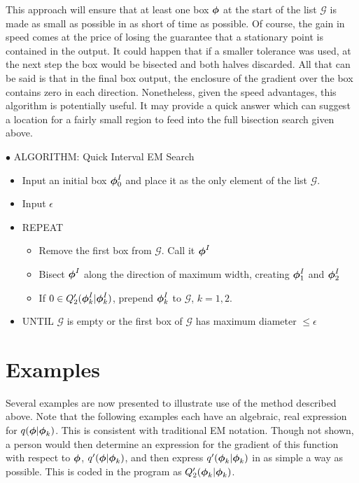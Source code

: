   This approach will ensure that at least one box $\mbox{\boldmath $\phi$}$ at the
start of the list $\mathcal{G}$ is made as small as possible in as
short of time as possible.  Of course, the gain in speed comes at
the price of losing the guarantee that a stationary point is
contained in the output.  It could happen that if a smaller
tolerance was used, at the next step the box would be bisected and
both halves discarded.  All that can be said is that in the final
box output, the enclosure of the gradient over the box contains zero
in each direction.  Nonetheless, given the speed advantages,
this algorithm is potentially useful.  It may provide a quick answer
which can suggest a location for a fairly small region to feed into
the full bisection search given above.


$\bullet$ ALGORITHM: Quick Interval EM Search
\begin{itemize}
\item[] Input an initial box $\mbox{\boldmath $\phi$}^I_0$ and place it as the only element of the list $\mathcal{G}$.
\item[] Input $\epsilon$
\item[] REPEAT
  \begin{itemize}
  \item[] Remove the first box from $\mathcal{G}$.  Call it $\mbox{\boldmath $\phi$}^I$
  \item[] Bisect $\mbox{\boldmath $\phi$}^I$ along the direction of maximum width,
  creating $\mbox{\boldmath $\phi$}^I_1$ and $\mbox{\boldmath $\phi$}^I_2$
  \item[] If $0 \in Q'_2(\mbox{\boldmath $\phi$}^I_k|\mbox{\boldmath $\phi$}^I_k)$, prepend $\mbox{\boldmath $\phi$}^I_k$ to
  $\mathcal{G}$, $k=1,2$.
  \end{itemize}
\item[] UNTIL $\mathcal{G}$ is empty or the first box of
  $\mathcal{G}$ has maximum diameter $ \leq \epsilon$
\end{itemize}


\section{Examples}\label{section:examples}

Several examples are now presented to illustrate use of
the method described above.
Note that the following examples each have an algebraic, real expression for
$q(\mbox{\boldmath $\phi$} | \mbox{\boldmath $\phi$}_k)$.  This is consistent with traditional EM notation. 
Though not shown, a person would then determine an expression for the gradient
of this function with respect to $\mbox{\boldmath $\phi$}$, $q'(\mbox{\boldmath $\phi$} | \mbox{\boldmath $\phi$}_k)$, and then
express $q'(\mbox{\boldmath $\phi$}_k | \mbox{\boldmath $\phi$}_k)$ in as simple a way as possible.  This is
coded in the program as $Q'_2(\mbox{\boldmath $\phi$}_k | \mbox{\boldmath $\phi$}_k)$.


